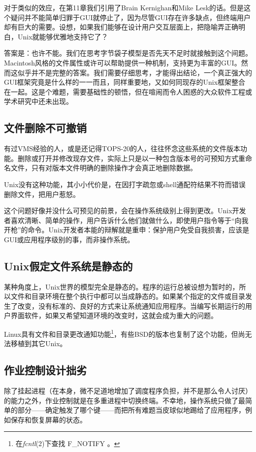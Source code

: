\documentclass[12pt,oneside]{book}
\begin{document}
对于类似的效应，在第11章我们引用了Brain Kernighan和Mike Lesk的话。但是这个疑问并不能简单归罪于GUI就停止了，因为尽管GUI存在许多缺点，但终端用户却有巨大的需要。设想，如果我们能够在设计用户交互层面上，把隐喻弄正确明白，Unix就能够优雅地支持它了？

答案是：也许不能。我们在思考字节袋子模型是否先天不足时就接触到这个间题。Macintosh风格的文件属性或许可以帮助提供一种机制，支持更为丰富的GUI。然而这似乎并不是完整的答案。我们需要仔细思考，才能得出结论，一个真正强大的GUI框架究竟是什么样的一一而且，同样重要地，又如何同现存的Unix框架整合在一起。这是个难题，需要基础性的顿悟，但在喧闹而令人困惑的大众软件工程或学术研究中还未出现。

\subsection{文件删除不可撤销}
有过VMS经验的人，或是还记得TOPS-20的人，往往怀念这些系统的文件版本功能。删除或打开并修改现存文件，实际上只是以一种包含版本号的可预知方式重命名文件，只有对版本文件明确的删除操作才会真正地删除数据。

Unix没有这种功能，其小小代价是，在因打字疏忽或shell通配符结果不符而错误删除文件，把用户惹怒。

这个问题好像并没什么可预见的前景，会在操作系统级别上得到更改。Unix开发者喜欢清晰、简单的操作，用户告诉什么他们就做什么，即使用户指令等于“向我开枪”的命令。Unix开发者本能的辩解就是重申：保护用户免受自我损害，应该是GUI或应用程序级别的事，而非操作系统。

\subsection{Unix假定文件系统是静态的}
某种角度上，Unix世界的模型完全是静态的。程序的运行总被设想为暂时的，所以文件和目录环境在整个执行中都可以当成静态的。如果某个指定的文件或目录发生了改变，没有标准的、良好的方式来让系统通知应用程序。当编写长期运行的用户界面软件，如果又希望知道环境的改变时，这就会成为重大的问题。

Linux具有文件和目录更改通知功能\footnote{在\textit{fcntl}(2)下查找 F\_{}NOTIFY 。}，有些BSD的版本也复制了这个功能，但尚无法移植到其它Unix。

\subsection{作业控制设计拙劣}
除了挂起进程（在本身，微不足道地增加了调度程序负担，并不是那么令人讨厌）的能力之外，作业控制就是在多重进程中切换终端。不幸地，操作系统只做了最简单的部分——确定触发了哪个键——而把所有难题当皮球似地踢给了应用程序，例如保存和恢复屏幕的状态。
\end{document}
